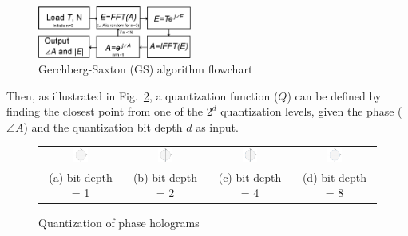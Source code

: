 	\begin{figure} [ht]
	   \begin{center}
	   \includegraphics[width = 0.45\textwidth]{GS_flowchart.eps}
	   \end{center}
	   \caption{\label{fig:GS_flowchart} Gerchberg-Saxton (GS) \cite{Gerchberg1972} algorithm flowchart}
	\end{figure}
	
	Then, as illustrated in Fig.~\ref{fig:Quantization_bit_depth}, a quantization function ($Q$) can be defined by finding the closest point from one of the $2^d$ quantization levels, given the phase ($\angle A$) and the quantization bit depth $d$ as input. 
	
	\begin{figure} [ht]
		\begin{center}
			\begin{tabular}{c c c c}
				\includegraphics[width = 0.2\textwidth]{Quantization_bit_depth_1.jpg} & \includegraphics[width = 0.2\textwidth]{Quantization_bit_depth_2.jpg} & \includegraphics[width = 0.2\textwidth]{Quantization_bit_depth_4.jpg} & \includegraphics[width = 0.2\textwidth]{Quantization_bit_depth_8.jpg}\\
				(a) bit depth = 1 & (b) bit depth = 2 & (c) bit depth = 4 & (d) bit depth = 8
			\end{tabular}
			\caption{\label{fig:Quantization_bit_depth} Quantization of phase holograms}
		\end{center}
	\end{figure}
	
